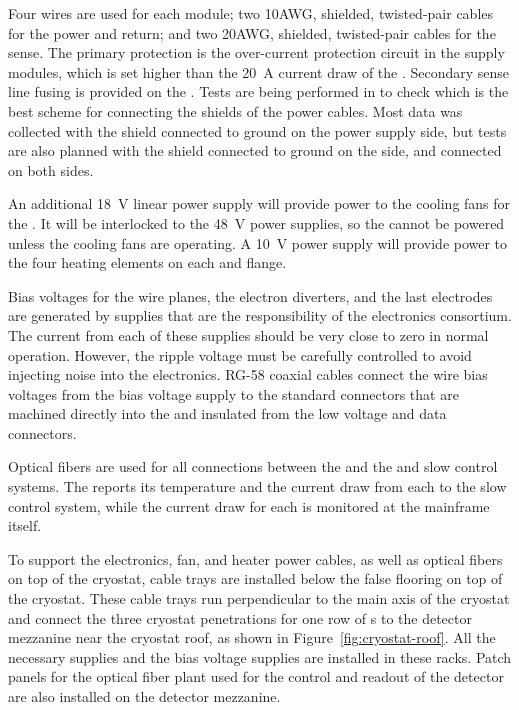 Four wires are used for each  module; two 10AWG, shielded, twisted-pair 
cables for the power and return; and two 20AWG, shielded, twisted-pair 
cables for the sense. The primary protection is the over-current 
protection circuit in the  supply modules, which is set 
higher than the \SI{20}{A} current draw of the . 
Secondary sense line fusing is provided on the .  
Tests are being performed in  to check which is the
best scheme for connecting the shields of the power cables. Most 
data was collected with the shield connected to ground on the 
power supply side, but tests are also planned with the shield
connected to ground on the  side, and connected on both sides. %

An additional \SI{18}{V} linear power supply will provide power to the 
cooling fans for the . It will be interlocked to the \SI{48}{V} 
power supplies, so the  cannot be powered unless the cooling 
fans are operating. A \SI{10}{V} power supply will provide power to the four 
heating elements on each  and  flange.

Bias voltages for the  wire planes, the electron diverters, 
and the last  electrodes are generated by supplies that are 
the responsibility of the  electronics consortium.  The 
current from each of these supplies should be very close to zero in 
normal operation. However, the ripple voltage must be carefully 
controlled to avoid injecting noise into the  electronics.  
RG-58 coaxial cables connect the wire bias voltages from the bias voltage
supply to the standard  connectors that are machined directly 
into the  \fdth and insulated from the low voltage and 
data connectors.

Optical fibers are used for all connections between the  %
and the  and slow 
control systems.  The  reports its temperature 
and the current draw from each  to the slow control system, 
while the current draw for each  is monitored at the 
mainframe itself.

To support the electronics, fan, and heater power cables, as well 
as optical fibers on top of the cryostat, cable trays are installed
below the false flooring on top of the cryostat. These cable trays
run perpendicular to the main axis of the cryostat and connect the
three cryostat penetrations for one row of s to the detector
mezzanine near the cryostat roof, as shown in Figure~\ref{fig:cryostat-roof}.
All the necessary  supplies and %
the bias
voltage supplies are installed in these racks. Patch panels for
the optical fiber plant used for the control and readout of the
detector are also installed on the detector mezzanine.

